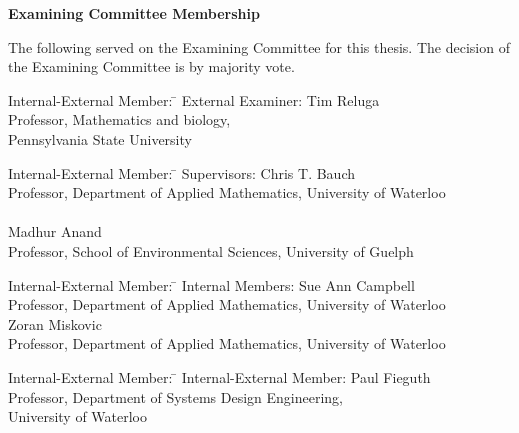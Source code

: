 \cleardoublepage %

 
\begin{center}\textbf{Examining Committee Membership}\end{center}
  \noindent
The following served on the Examining Committee for this thesis. The decision of the Examining Committee is by majority vote.
  \bigskip
  
  \noindent
\begin{tabbing}
Internal-External Member:  \=  \kill %
External Examiner: \> Tim Reluga  \\ 
\> Professor, Mathematics and biology,\\
\> Pennsylvania State University\\
\end{tabbing} 
  \bigskip
  
  \noindent
\begin{tabbing}
Internal-External Member: \=  \kill %
Supervisors: \> Chris T. Bauch \\
\> Professor, Department of Applied Mathematics, University of Waterloo \\
\>\\
\> Madhur Anand \\
\> Professor, School of Environmental Sciences, University of Guelph \\
\end{tabbing}
  \bigskip
  
  \noindent
  \begin{tabbing}
Internal-External Member: \=  \kill %
Internal Members: \> Sue Ann Campbell \\
\> Professor, Department of Applied Mathematics, University of Waterloo \\ 
\> Zoran Miskovic  \\
\> Professor, Department of Applied Mathematics, University of Waterloo \\
\end{tabbing}
  \bigskip
  
  \noindent
\begin{tabbing}
Internal-External Member: \=  \kill %
Internal-External Member: \> Paul Fieguth \\
\> Professor, Department of Systems Design Engineering,\\
\> University of Waterloo \\
\end{tabbing}
  

